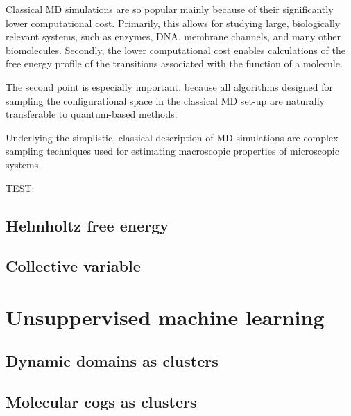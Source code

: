 Classical MD simulations are so popular mainly because of their significantly lower computational cost.
Primarily, this allows for studying large, biologically relevant systems, such as enzymes, DNA, membrane channels, and many other biomolecules.
Secondly, the lower computational cost enables calculations of the free energy profile of the transitions associated with the function of a molecule.


The second point is especially important, because all algorithms designed for sampling the configurational space in the classical MD set-up are naturally transferable to quantum-based methods.

Underlying the simplistic, classical description of MD simulations are complex sampling techniques used for estimating macroscopic properties of microscopic systems.

TEST: \cite{gorecki2009redmd}

\subsection{Helmholtz free energy}

\subsection{Collective variable}

\section{Unsuppervised machine learning}

\subsection{Dynamic domains as clusters}

\subsection{Molecular cogs as clusters}
